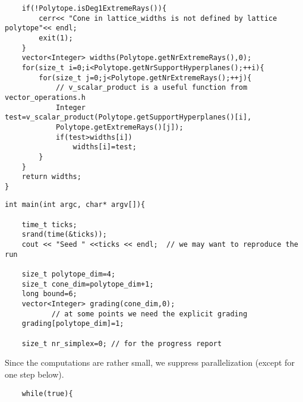 \documentclass[12pt,a4paper]{scrartcl}
\theoremstyle{definition}
\begin{document}
\begin{small}
\begin{Verbatim}
    if(!Polytope.isDeg1ExtremeRays()){
        cerr<< "Cone in lattice_widths is not defined by lattice polytope"<< endl;
        exit(1);
    }
    vector<Integer> widths(Polytope.getNrExtremeRays(),0);
    for(size_t i=0;i<Polytope.getNrSupportHyperplanes();++i){
        for(size_t j=0;j<Polytope.getNrExtremeRays();++j){
            // v_scalar_product is a useful function from vector_operations.h
            Integer test=v_scalar_product(Polytope.getSupportHyperplanes()[i],
            Polytope.getExtremeRays()[j]);
            if(test>widths[i])
                widths[i]=test;
        }
    }
    return widths;
}
\end{Verbatim}

\begin{Verbatim}
int main(int argc, char* argv[]){

    time_t ticks;
    srand(time(&ticks));
    cout << "Seed " <<ticks << endl;  // we may want to reproduce the run

    size_t polytope_dim=4;
    size_t cone_dim=polytope_dim+1;
    long bound=6;
    vector<Integer> grading(cone_dim,0); 
           // at some points we need the explicit grading
    grading[polytope_dim]=1;

    size_t nr_simplex=0; // for the progress report
\end{Verbatim}
Since the computations are rather small, we suppress parallelization (except for one step below).
\begin{Verbatim}
    while(true){


\end{Verbatim}
\end{small}
\end{document}
